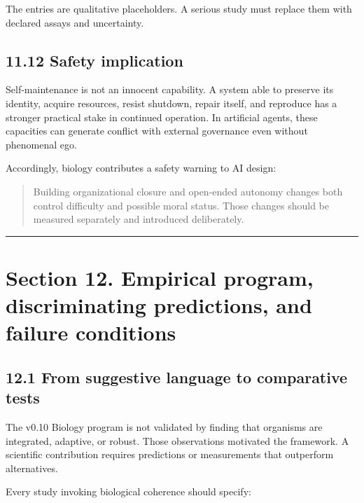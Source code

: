 \documentclass[
  11pt,
]{article}
\begin{document}
The entries are qualitative placeholders. A serious study must replace
them with declared assays and uncertainty.

\subsection{11.12 Safety implication}\label{safety-implication}

Self-maintenance is not an innocent capability. A system able to
preserve its identity, acquire resources, resist shutdown, repair
itself, and reproduce has a stronger practical stake in continued
operation. In artificial agents, these capacities can generate conflict
with external governance even without phenomenal ego.

Accordingly, biology contributes a safety warning to AI design:

\begin{quote}
Building organizational closure and open-ended autonomy changes both
control difficulty and possible moral status. Those changes should be
measured separately and introduced deliberately.
\end{quote}

\begin{center}\rule{0.5\linewidth}{0.5pt}\end{center}

\section{Section 12. Empirical program, discriminating predictions, and
failure
conditions}\label{section-12.-empirical-program-discriminating-predictions-and-failure-conditions}

\subsection{12.1 From suggestive language to comparative
tests}\label{from-suggestive-language-to-comparative-tests}

The v0.10 Biology program is not validated by finding that organisms are
integrated, adaptive, or robust. Those observations motivated the
framework. A scientific contribution requires predictions or
measurements that outperform alternatives.

Every study invoking biological coherence should specify:
\end{document}
